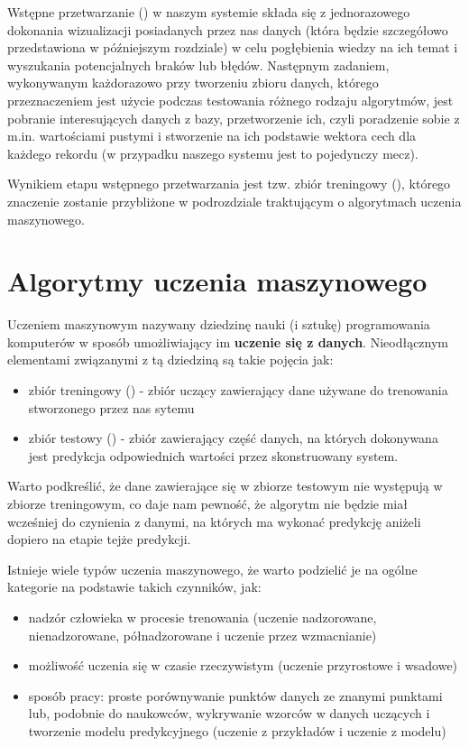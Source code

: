 Wstępne przetwarzanie () w naszym systemie składa się z jednorazowego dokonania wizualizacji posiadanych przez nas danych (która będzie szczegółowo przedstawiona w późniejszym rozdziale) w celu pogłębienia wiedzy na ich temat i wyszukania potencjalnych braków lub błędów. Następnym zadaniem, wykonywanym każdorazowo przy tworzeniu zbioru danych, którego przeznaczeniem jest użycie podczas testowania różnego rodzaju algorytmów, jest pobranie interesujących danych z bazy, przetworzenie ich, czyli poradzenie sobie z m.in. wartościami pustymi i stworzenie na ich podstawie wektora cech dla każdego rekordu (w przypadku naszego systemu jest to pojedynczy mecz). 

Wynikiem etapu wstępnego przetwarzania jest tzw. zbiór treningowy (), którego znaczenie zostanie przybliżone w podrozdziale traktującym o algorytmach uczenia maszynowego.

\section{Algorytmy uczenia maszynowego}
Uczeniem maszynowym nazywany dziedzinę nauki (i sztukę) programowania komputerów w sposób umożliwiający im \textbf{uczenie się z danych}. \cite{Geron} Nieodłącznym elementami związanymi z tą dziedziną są takie pojęcia jak: 
\begin{itemize}
    \item zbiór treningowy () - zbiór uczący zawierający dane używane do trenowania stworzonego przez nas sytemu
    \item zbiór testowy () - zbiór zawierający część danych, na których dokonywana jest predykcja odpowiednich wartości przez skonstruowany system.
\end{itemize}
Warto podkreślić, że dane zawierające się w zbiorze testowym nie występują w zbiorze treningowym, co daje nam pewność, że algorytm nie będzie miał wcześniej do czynienia z danymi, na których ma wykonać predykcję aniżeli dopiero na etapie tejże predykcji.

Istnieje wiele typów uczenia maszynowego, że warto podzielić je na ogólne kategorie na podstawie takich czynników, jak:
\begin{itemize}
    \item nadzór człowieka w procesie trenowania (uczenie nadzorowane, nienadzorowane, półnadzorowane i uczenie przez wzmacnianie)
    \item możliwość uczenia się w czasie rzeczywistym (uczenie przyrostowe i wsadowe)
    \item sposób pracy: proste porównywanie punktów danych ze znanymi punktami lub, podobnie do naukowców, wykrywanie wzorców w danych uczących i tworzenie modelu predykcyjnego (uczenie z przykładów i uczenie z modelu)
\end{itemize}

